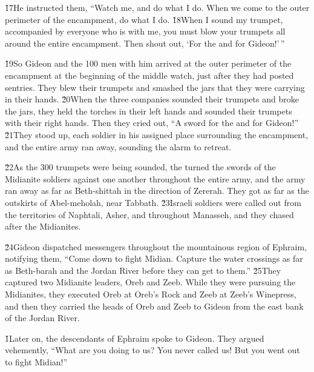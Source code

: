 \v{17}He instructed them, ``Watch me, and do what I do. When we come to the outer perimeter of the encampment, do what I do. \v{18}When I sound my trumpet, accompanied by everyone who is with me, you must blow your trumpets all around the entire encampment. Then shout out, `For the  and for Gideon!'\,''

\v{19}So Gideon and the 100 men with him arrived at the outer perimeter of the encampment at the beginning of the middle watch, just after they had posted sentries. They blew their trumpets and smashed the jars that they were carrying in their hands. \v{20}When the three companies sounded their trumpets and broke the jars, they held the torches in their left hands and sounded their trumpets with their right hands. Then they cried out, ``A sword for the  and for Gideon!'' \v{21}They stood up, each soldier in his assigned place surrounding the encampment, and the entire army ran away, sounding the alarm to retreat.

\v{22}As the 300 trumpets were being sounded, the  turned the swords of the Midianite soldiers against one another throughout the entire army, and the army ran away as far as Beth-shittah in the direction of Zererah. They got as far as the outskirts of Abel-meholah, near Tabbath. \v{23}Israeli soldiers were called out from the territories of Naphtali, Asher, and throughout Manasseh, and they chased after the Midianites.

\v{24}Gideon dispatched messengers throughout the mountainous region of Ephraim, notifying them, ``Come down to fight Midian. Capture the water crossings as far as Beth-barah and the Jordan River before they can get to them.'' \v{25}They captured two Midianite leaders, Oreb and Zeeb. While they were pursuing the Midianites, they executed Oreb at Oreb's Rock and Zeeb at Zeeb's Winepress, and then they carried the heads of Oreb and Zeeb to Gideon from the east bank of the Jordan River.

\v{1}Later on, the descendants of Ephraim spoke to Gideon. They argued vehemently, ``What are you doing to us? You never called us! But you went out to fight Midian!''

